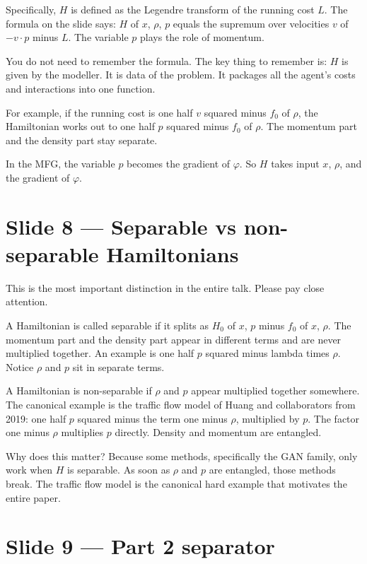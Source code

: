 \documentclass[11pt]{article}
\begin{document}
Specifically, $H$ is defined as the Legendre transform of the running cost
$L$. The formula on the slide says: $H$ of $x$, $\rho$, $p$ equals the
supremum over velocities $v$ of $-v\cdot p$ minus $L$. The variable $p$
plays the role of momentum.

You do not need to remember the formula. The key thing to remember is: $H$
is given by the modeller. It is data of the problem. It packages all the
agent's costs and interactions into one function.

For example, if the running cost is one half $v$ squared minus $f_0$ of
$\rho$, the Hamiltonian works out to one half $p$ squared minus $f_0$ of
$\rho$. The momentum part and the density part stay separate.

In the MFG, the variable $p$ becomes the gradient of $\varphi$. So $H$
takes input $x$, $\rho$, and the gradient of $\varphi$.

\section*{Slide 8 --- Separable vs non-separable Hamiltonians}

This is the most important distinction in the entire talk. Please pay close
attention.

A Hamiltonian is called separable if it splits as $H_0$ of $x$, $p$ minus
$f_0$ of $x$, $\rho$. The momentum part and the density part appear in
different terms and are never multiplied together. An example is one half
$p$ squared minus lambda times $\rho$. Notice $\rho$ and $p$ sit in
separate terms.

A Hamiltonian is non-separable if $\rho$ and $p$ appear multiplied together
somewhere. The canonical example is the traffic flow model of Huang and
collaborators from 2019: one half $p$ squared minus the term one minus
$\rho$, multiplied by $p$. The factor one minus $\rho$ multiplies $p$
directly. Density and momentum are entangled.

Why does this matter? Because some methods, specifically the GAN family,
only work when $H$ is separable. As soon as $\rho$ and $p$ are entangled,
those methods break. The traffic flow model is the canonical hard example
that motivates the entire paper.

\section*{Slide 9 --- Part 2 separator}
\end{document}
